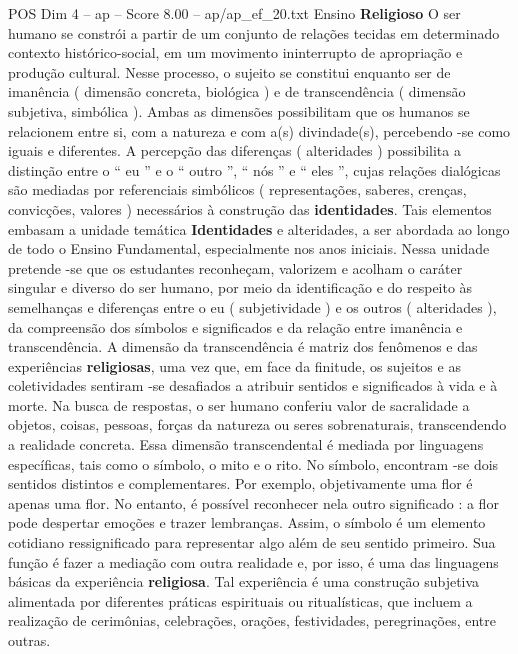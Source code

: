 \begin{textsample}{POS Dim 4 – ap – Score 8.00 – ap/ap\_ef\_20.txt}  \label{ex:f4_pos_238}
Ensino \textbf{Religioso} O ser humano se constrói a partir de um conjunto de relações tecidas em determinado contexto histórico-social, em um movimento ininterrupto de apropriação e produção cultural.
Nesse processo, o sujeito se constitui enquanto ser de imanência ( dimensão concreta, biológica ) e de transcendência ( dimensão subjetiva, simbólica ).
Ambas as dimensões possibilitam que os humanos se relacionem entre si, com a natureza e com a(s) divindade(s), percebendo -se como iguais e diferentes.
A percepção das diferenças ( alteridades ) possibilita a distinção entre o “ eu ” e o “ outro ”, “ nós ” e “ eles ”, cujas relações dialógicas são mediadas por referenciais simbólicos ( representações, saberes, crenças, convicções, valores ) necessários à construção das \textbf{identidades}.
Tais elementos embasam a unidade temática \textbf{Identidades} e alteridades, a ser abordada ao longo de todo o Ensino Fundamental, especialmente nos anos iniciais.
Nessa unidade pretende -se que os estudantes reconheçam, valorizem e acolham o caráter singular e diverso do ser humano, por meio da identificação e do respeito às semelhanças e diferenças entre o eu ( subjetividade ) e os outros ( alteridades ), da compreensão dos símbolos e significados e da relação entre imanência e transcendência.
A dimensão da transcendência é matriz dos fenômenos e das experiências \textbf{religiosas}, uma vez que, em face da finitude, os sujeitos e as coletividades sentiram -se desafiados a atribuir sentidos e significados à vida e à morte.
Na busca de respostas, o ser humano conferiu valor de sacralidade a objetos, coisas, pessoas, forças da natureza ou seres sobrenaturais, transcendendo a realidade concreta.
Essa dimensão transcendental é mediada por linguagens específicas, tais como o símbolo, o mito e o rito.
No símbolo, encontram -se dois sentidos distintos e complementares.
Por exemplo, objetivamente uma flor é apenas uma flor.
No entanto, é possível reconhecer nela outro significado : a flor pode despertar emoções e trazer lembranças.
Assim, o símbolo é um elemento cotidiano ressignificado para representar algo além de seu sentido primeiro.
Sua função é fazer a mediação com outra realidade e, por isso, é uma das linguagens básicas da experiência \textbf{religiosa}.
Tal experiência é uma construção subjetiva alimentada por diferentes práticas espirituais ou ritualísticas, que incluem a realização de cerimônias, celebrações, orações, festividades, peregrinações, entre outras.

\end{textsample}
